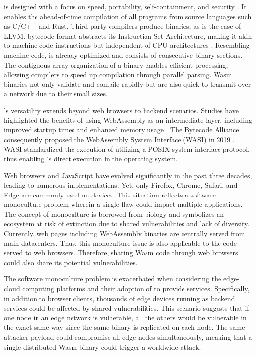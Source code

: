 \Wasm is designed with a focus on speed, portability, self-containment, and security \cite{Haas_2017}. 
It enables the ahead-of-time compilation of all programs from source languages such as C/C++ and Rust. 
Third-party compilers produce \Wasm binaries, as is the case of LLVM. 
\Wasm bytecode format abstracts its Instruction Set Architecture, making it akin to machine code instructions but independent of CPU architectures \cite{wasm_spec}. 
Resembling machine code, \Wasm is already optimized and consists of consecutive binary sections. 
The contiguous array organization of a \Wasm binary enables efficient processing, allowing compilers to speed up compilation through parallel parsing. 
Wasm binaries not only validate and compile rapidly but are also quick to transmit over a network due to their small sizes.

\Wasm's versatility extends beyond web browsers to backend scenarios. 
Studies have highlighted the benefits of using WebAssembly as an intermediate layer, including improved startup times and enhanced memory usage \cite{pMendkiServerless, 1244493Jacobsson}. 
The Bytecode Alliance consequently proposed the WebAssembly System Interface (WASI) in 2019 \cite{bytecodealliance, WASI}.
WASI standardized the execution of \Wasm utilizing a POSIX system interface protocol, thus enabling \Wasm's direct execution in the operating system.



Web browsers and JavaScript have evolved significantly in the past three decades, leading to numerous implementations. 
Yet, only Firefox, Chrome, Safari, and Edge are commonly used on devices.
This situation reflects a software monoculture problem wherein a single flaw could impact multiple applications. 
The concept of monoculture is borrowed from biology and symbolizes an ecosystem at risk of extinction due to shared vulnerabilities and lack of diversity. 
Currently, web pages including WebAssembly binaries are centrally served from main datacenters. 
Thus, this monoculture issue is also applicable to the \Wasm code served to web browsers. 
Therefore, sharing Wasm code through web browsers could also share its potential vulnerabilities. 

The software monoculture problem is exacerbated when considering the edge-cloud computing platforms and their adoption of \Wasm to provide services.
Specifically, in addition to browser clients, thousands of edge devices running \Wasm as backend services could be affected by shared vulnerabilities. 
This scenario suggests that if one node in an edge network is vulnerable, all the others would be vulnerable in the exact same way since the same binary is replicated on each node. 
The same attacker payload could compromise all edge nodes simultaneously, meaning that a single distributed Wasm binary could trigger a worldwide attack.


